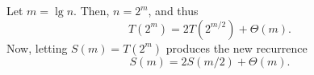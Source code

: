 Let $m=\lg n$.
Then, $n=2^m$, and thus
\[
    T(2^m) = 2T(2^{m/2})+\Theta(m).
\]
Now, letting $S(m)=T(2^m)$ produces the new recurrence
\[
    S(m) = 2S(m/2)+\Theta(m).
\]
